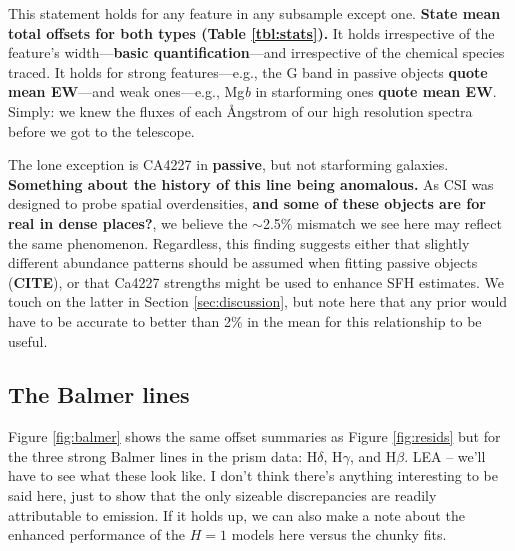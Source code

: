\documentclass[a4paper,fleqn,usenatbib]{mnras}
\newcommand{\bfr}{\bf\color{red}}
\newcommand{\bfb}{\color{myblue}}
\newcommand{\CITE}{{\bfr CITE}}
\begin{document}
This statement holds for any feature in any subsample except one. 
{\bfr State mean total offsets for both types (Table \ref{tbl:stats}).} It holds irrespective of the feature's 
width---{\bfr basic quantification}---and irrespective of the chemical species traced. 
It holds for strong features---e.g., the G band in passive objects {\bfr quote mean
EW}---and weak ones---e.g., Mg{\it b} in starforming ones {\bfr quote mean EW}. Simply: we 
knew the fluxes of each \AA ngstrom of our high resolution spectra before we got to the
telescope.

The lone exception is CA4227 in {\bfr passive}, but not starforming galaxies. {\bfr Something 
about the history of this line being anomalous.} As CSI was designed to probe spatial overdensities, {\bfr
and some of these objects are for real in dense places?}, we believe the $\sim$2.5\%
mismatch we see here may reflect the same phenomenon. Regardless, this finding suggests either that
slightly different abundance patterns should be assumed when fitting passive objects (\CITE), 
or that Ca4227 strengths might be used to enhance SFH estimates. We touch on the latter in 
Section \ref{sec:discussion}, but note here that any prior would have to be accurate to better than 
2\% in the mean for this relationship to be useful.

\subsection{The Balmer lines}
\label{sec:balmer}

Figure \ref{fig:balmer} shows the same offset summaries as Figure \ref{fig:resids} but for the three
strong Balmer lines in the prism data: H$\delta$, H$\gamma$, and H$\beta$. {\bfb LEA -- we'll have 
to see what these look like. I don't think there's anything interesting to be said here, just to show that
the only sizeable discrepancies are readily attributable to emission. If it holds up, we can also make
a note about the enhanced performance of the $H=1$ models here versus the chunky fits.}
\end{document}
